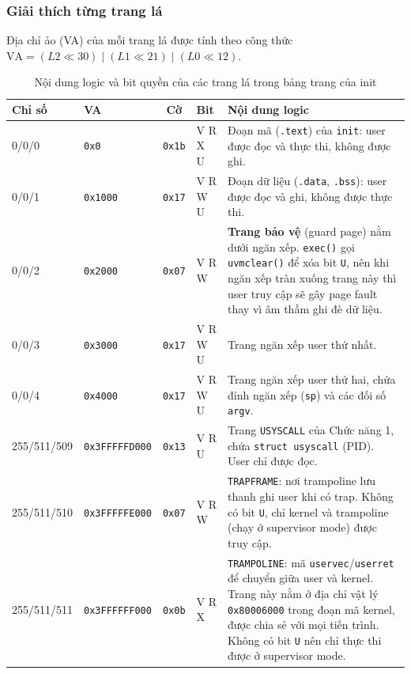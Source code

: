 \subsubsection{Giải thích từng trang lá}
Địa chỉ ảo (VA) của mỗi trang lá được tính theo công thức $\text{VA} = (L2 \ll 30) \mid (L1 \ll 21) \mid (L0 \ll 12)$.

\begin{table}[h!]
    \centering
    \caption{Nội dung logic và bit quyền của các trang lá trong bảng trang của init}
    \label{tab:vmprint_leaves}
    \small
    \begin{tabularx}{\textwidth}{l l c l X}
        \toprule
        \textbf{Chỉ số} & \textbf{VA} & \textbf{Cờ} & \textbf{Bit} & \textbf{Nội dung logic} \\
        \midrule
        0/0/0 & \texttt{0x0} & \texttt{0x1b} & V R X U & Đoạn mã (\texttt{.text}) của \texttt{init}: user được đọc và thực thi, không được ghi. \\
        0/0/1 & \texttt{0x1000} & \texttt{0x17} & V R W U & Đoạn dữ liệu (\texttt{.data}, \texttt{.bss}): user được đọc và ghi, không được thực thi. \\
        0/0/2 & \texttt{0x2000} & \texttt{0x07} & V R W & \textbf{Trang bảo vệ} (guard page) nằm dưới ngăn xếp. \texttt{exec()} gọi \texttt{uvmclear()} để xóa bit \texttt{U}, nên khi ngăn xếp tràn xuống trang này thì user truy cập sẽ gây page fault thay vì âm thầm ghi đè dữ liệu. \\
        0/0/3 & \texttt{0x3000} & \texttt{0x17} & V R W U & Trang ngăn xếp user thứ nhất. \\
        0/0/4 & \texttt{0x4000} & \texttt{0x17} & V R W U & Trang ngăn xếp user thứ hai, chứa đỉnh ngăn xếp (\texttt{sp}) và các đối số \texttt{argv}. \\
        255/511/509 & \texttt{0x3FFFFFD000} & \texttt{0x13} & V R U & Trang \texttt{USYSCALL} của Chức năng 1, chứa \texttt{struct usyscall} (PID). User chỉ được đọc. \\
        255/511/510 & \texttt{0x3FFFFFE000} & \texttt{0x07} & V R W & \texttt{TRAPFRAME}: nơi trampoline lưu thanh ghi user khi có trap. Không có bit \texttt{U}, chỉ kernel và trampoline (chạy ở supervisor mode) được truy cập. \\
        255/511/511 & \texttt{0x3FFFFFF000} & \texttt{0x0b} & V R X & \texttt{TRAMPOLINE}: mã \texttt{uservec}/\texttt{userret} để chuyển giữa user và kernel. Trang này nằm ở địa chỉ vật lý \texttt{0x80006000} trong đoạn mã kernel, được chia sẻ với mọi tiến trình. Không có bit \texttt{U} nên chỉ thực thi được ở supervisor mode. \\
        \bottomrule
    \end{tabularx}
\end{table}

